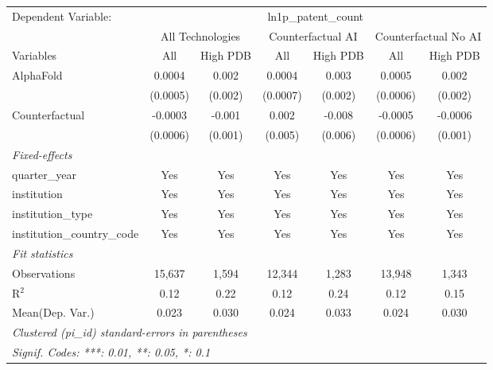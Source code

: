 \begingroup
\centering
\begin{tabular}{lcccccc}
   \tabularnewline \midrule \midrule
   Dependent Variable: & \multicolumn{6}{c}{ln1p\_patent\_count}\\
 & \multicolumn{2}{c}{All Technologies} & \multicolumn{2}{c}{Counterfactual AI} & \multicolumn{2}{c}{Counterfactual No AI} \\
\cmidrule(lr){1-1}\cmidrule(lr){2-3} \cmidrule(lr){4-5} \cmidrule(lr){6-7}
Variables & \multicolumn{1}{c}{All} & \multicolumn{1}{c}{High PDB} & \multicolumn{1}{c}{All} & \multicolumn{1}{c}{High PDB} & \multicolumn{1}{c}{All} & \multicolumn{1}{c}{High PDB} \\
\cmidrule(lr){1-1}\cmidrule(lr){2-2} \cmidrule(lr){3-3} \cmidrule(lr){4-4} \cmidrule(lr){5-5} \cmidrule(lr){6-6} \cmidrule(lr){7-7}
   AlphaFold                    & 0.0004   & 0.002   & 0.0004   & 0.003   & 0.0005   & 0.002\\   
                                & (0.0005) & (0.002) & (0.0007) & (0.002) & (0.0006) & (0.002)\\   
   Counterfactual               & -0.0003  & -0.001  & 0.002    & -0.008  & -0.0005  & -0.0006\\   
                                & (0.0006) & (0.001) & (0.005)  & (0.006) & (0.0006) & (0.001)\\   
   \midrule
   \emph{Fixed-effects}\\
   quarter\_year                & Yes      & Yes     & Yes      & Yes     & Yes      & Yes\\  
   institution                  & Yes      & Yes     & Yes      & Yes     & Yes      & Yes\\  
   institution\_type            & Yes      & Yes     & Yes      & Yes     & Yes      & Yes\\  
   institution\_country\_code   & Yes      & Yes     & Yes      & Yes     & Yes      & Yes\\  
   \midrule
   \emph{Fit statistics}\\
   Observations                 & 15,637   & 1,594   & 12,344   & 1,283   & 13,948   & 1,343\\  
   R$^2$                        & 0.12     & 0.22    & 0.12     & 0.24    & 0.12     & 0.15\\  
Mean(Dep. Var.) & 0.023 & 0.030 & 0.024 & 0.033 & 0.024 & 0.030 \\
   \midrule \midrule
   \multicolumn{7}{l}{\emph{Clustered (pi\_id) standard-errors in parentheses}}\\
   \multicolumn{7}{l}{\emph{Signif. Codes: ***: 0.01, **: 0.05, *: 0.1}}\\
\end{tabular}
\par\endgroup
